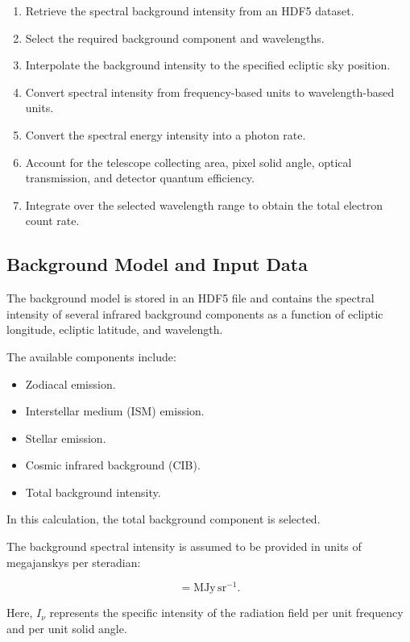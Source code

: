 \documentclass{article}
\begin{document}
\begin{enumerate}
    \item Retrieve the spectral background intensity from an HDF5 dataset.
    \item Select the required background component and wavelengths.
    \item Interpolate the background intensity to the specified ecliptic sky position.
    \item Convert spectral intensity from frequency-based units to wavelength-based units.
    \item Convert the spectral energy intensity into a photon rate.
    \item Account for the telescope collecting area, pixel solid angle, optical transmission, and detector quantum efficiency.
    \item Integrate over the selected wavelength range to obtain the total electron count rate.
\end{enumerate}

\subsection{Background Model and Input Data}

The background model is stored in an HDF5 file and contains the spectral intensity of several infrared background components as a function of ecliptic longitude, ecliptic latitude, and wavelength.

The available components include:

\begin{itemize}
    \item Zodiacal emission.
    \item Interstellar medium (ISM) emission.
    \item Stellar emission.
    \item Cosmic infrared background (CIB).
    \item Total background intensity.
\end{itemize}

In this calculation, the total background component is selected.

The background spectral intensity is assumed to be provided in units of megajanskys per steradian:

\begin{equation}
[I_{\nu}] = \mathrm{MJy\,sr^{-1}}.
\end{equation}

Here, $I_{\nu}$ represents the specific intensity of the radiation field per unit frequency and per unit solid angle.
\end{document}
